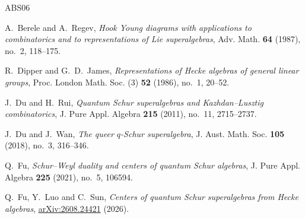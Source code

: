 \documentclass[11pt]{amsart}
\numberwithin{equation}{section}
\theoremstyle{plain}
\theoremstyle{definition}
\theoremstyle{remark}
\begin{document}



\begin{thebibliography}{ABS06}


A.~Berele and A.~Regev,
\emph{Hook Young diagrams with applications to combinatorics and to
representations of Lie superalgebras},
Adv. Math. \textbf{64} (1987), no.~2, 118--175.


R.~Dipper and G.~D.~James,
\emph{Representations of Hecke algebras of general linear groups},
Proc. London Math. Soc. (3) \textbf{52} (1986), no.~1, 20--52.

J.~Du and H.~Rui,
\emph{Quantum Schur superalgebras and Kazhdan--Lusztig combinatorics},
J. Pure Appl. Algebra \textbf{215} (2011), no.~11, 2715--2737.

J.~Du and J.~Wan,
\emph{The queer $q$-Schur superalgebra},
J. Aust. Math. Soc. \textbf{105} (2018), no.~3, 316--346.

Q.~Fu,
\emph{Schur--Weyl duality and centers of quantum Schur algebras},
J. Pure Appl. Algebra \textbf{225} (2021), no.~5, 106594.

Q.~Fu, Y.~Luo and C.~Sun,
\emph{Centers of quantum Schur superalgebras from Hecke algebras},
\href{https://arxiv.org/abs/2608.24421}{arXiv:2608.24421}
(2026).


\end{thebibliography}
\end{document}
